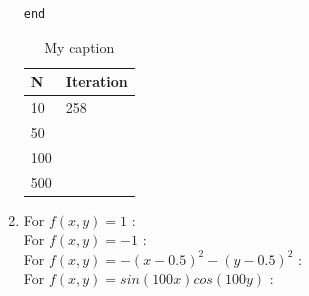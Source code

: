 \documentclass{article}
\begin{document}
\begin{enumerate}
\begin{lstlisting}
end
\end{lstlisting} 

\begin{table}[]
\centering
\caption{My caption}
\label{my-label}
\begin{tabular}{|l|l|}
\hline
N   & Iteration \\ \hline
10  & 258       \\ \hline
50  &           \\ \hline
100 &           \\ \hline
500 &           \\ \hline
\end{tabular}
\end{table}

\item 
For $ f(x,y) = 1 $ : \\

For $f(x,y) =-1 $ :  \\ 

For $f(x,y) = -(x-0.5)^2-(y-0.5)^2 $ : \\

For $f(x,y) = sin(100x)cos(100y) $ : \\

\end{enumerate}
\end{document}
